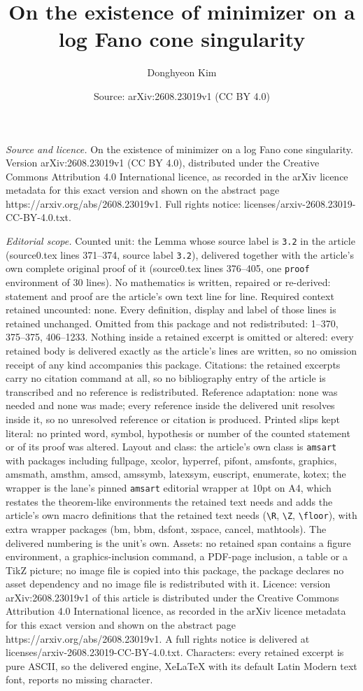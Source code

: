 \documentclass[10pt,a4paper]{amsart}
\title[On the existence of minimizer on a log Fano cone singularity]{On the existence of minimizer on a log Fano cone singularity}
\author{Donghyeon Kim}
\date{Source: arXiv:2608.23019v1 (CC BY 4.0)}
\begin{document}
\maketitle

\noindent\emph{Source and licence.} On the existence of minimizer on a log Fano cone singularity. Version arXiv:2608.23019v1 (CC BY 4.0), distributed under the Creative Commons Attribution 4.0 International licence, as recorded in the arXiv licence metadata for this exact version and shown on the abstract page https://arxiv.org/abs/2608.23019v1. Full rights notice: licenses/arxiv-2608.23019-CC-BY-4.0.txt.\par\smallskip

\noindent\textit{Editorial scope.} Counted unit: the Lemma whose source label is \texttt{3.2} in the article (source0.tex lines 371--374, source label \texttt{3.2}), delivered together with the article's own complete original proof of it (source0.tex lines 376--405, one \texttt{proof} environment of 30 lines). No mathematics is written, repaired or re-derived: statement and proof are the article's own text line for line. Required context retained uncounted: none. Every definition, display and label of those lines is retained unchanged. Omitted from this package and not redistributed: 1--370, 375--375, 406--1233. Nothing inside a retained excerpt is omitted or altered: every retained body is delivered exactly as the article's lines are written, so no omission receipt of any kind accompanies this package. Citations: the retained excerpts carry no citation command at all, so no bibliography entry of the article is transcribed and no reference is redistributed. Reference adaptation: none was needed and none was made; every reference inside the delivered unit resolves inside it, so no unresolved reference or citation is produced. Printed slips kept literal: no printed word, symbol, hypothesis or number of the counted statement or of its proof was altered. Layout and class: the article's own class is \texttt{amsart} with packages including fullpage, xcolor, hyperref, pifont, amsfonts, graphics, amsmath, amsthm, amscd, amssymb, latexsym, euscript, enumerate, kotex; the wrapper is the lane's pinned \texttt{amsart} editorial wrapper at 10pt on A4, which restates the theorem-like environments the retained text needs and adds the article's own macro definitions that the retained text needs (\texttt{\textbackslash R}, \texttt{\textbackslash Z}, \texttt{\textbackslash floor}), with extra wrapper packages (bm, bbm, dsfont, xspace, cancel, mathtools). The delivered numbering is the unit's own. Assets: no retained span contains a figure environment, a graphics-inclusion command, a PDF-page inclusion, a table or a TikZ picture; no image file is copied into this package, the package declares no asset dependency and no image file is redistributed with it. Licence: version arXiv:2608.23019v1 of this article is distributed under the Creative Commons Attribution 4.0 International licence, as recorded in the arXiv licence metadata for this exact version and shown on the abstract page https://arxiv.org/abs/2608.23019v1. A full rights notice is delivered at licenses/arxiv-2608.23019-CC-BY-4.0.txt. Characters: every retained excerpt is pure ASCII, so the delivered engine, XeLaTeX with its default Latin Modern text font, reports no missing character.
\end{document}
